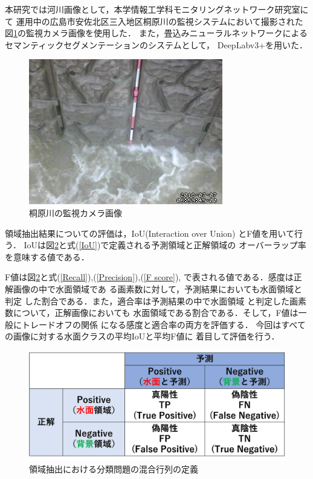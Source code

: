 本研究では河川画像として，本学情報工学科モニタリングネットワーク研究室にて
運用中の広島市安佐北区三入地区桐原川の監視システムにおいて撮影された
図\ref{togegawa}の監視カメラ画像を使用した．
また，畳込みニューラルネットワークによるセマンティックセグメンテーションのシステムとして，
DeepLabv3+\cite{deeplabv3+}を用いた．

\vspace{5mm}
\begin{figure}[h] 
  \begin{center}
    \includegraphics[width=0.8\linewidth]{image/070001.jpg}
  \end{center}
  \caption{桐原川の監視カメラ画像}
  \label{togegawa}
\end{figure}
\clearpage

領域抽出結果についての評価は，IoU(Interaction over Union)\cite{IoU}
とF値\cite{bf}を用いて行う．
IoUは図\ref{tp}と式(\ref{IoU})で定義される予測領域と正解領域の
オーバーラップ率を意味する値である．

F値は図\ref{tp}と式(\ref{Recall}),(\ref{Precision}),(\ref{F score}),
で表される値である．感度は正解画像の中で水面領域であ
る画素数に対して，予測結果においても水面領域と判定
した割合である．また，適合率は予測結果の中で水面領域
と判定した画素数について，正解画像においても
水面領域である割合である．そして，F値は一般にトレードオフの関係
になる感度と適合率の両方を評価する．
今回はすべての画像に対する水面クラスの平均IoUと平均F値に
着目して評価を行う．
\vspace{5mm}
\begin{figure}[ht] 
  \begin{center}
    \includegraphics[width=0.8\linewidth]{image/TP.png}
  \end{center}
  \caption{領域抽出における分類問題の混合行列の定義}
  \label{tp}
\end{figure}

